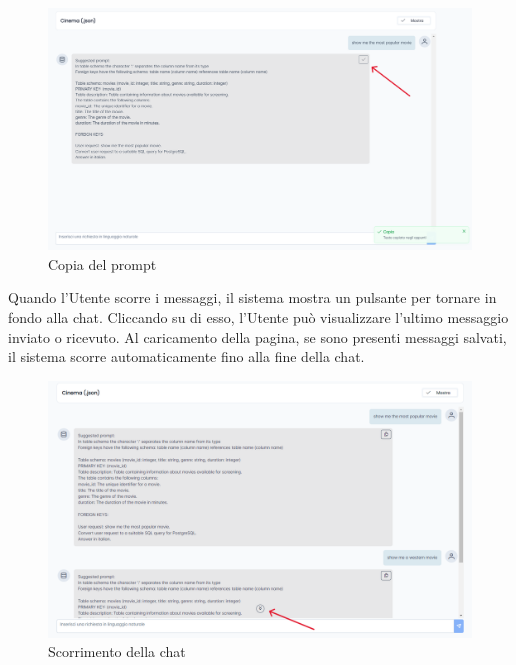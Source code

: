 \begin{figure}[H]
  \centering
  \includegraphics[width=\textwidth]{assets/copia.png}
  \caption{Copia del prompt}
\end{figure}

 \label{sec:scorrimento-chat}

\par Quando l'Utente scorre i messaggi, il sistema mostra un pulsante per tornare in fondo alla chat. Cliccando su di esso, l'Utente può visualizzare l'ultimo messaggio inviato o ricevuto. Al caricamento della pagina, se sono presenti messaggi salvati, il sistema scorre automaticamente fino alla fine della chat.

\begin{figure}[H]
  \centering
  \includegraphics[width=\textwidth]{assets/scroll_chat.png}
  \caption{Scorrimento della chat}
\end{figure}